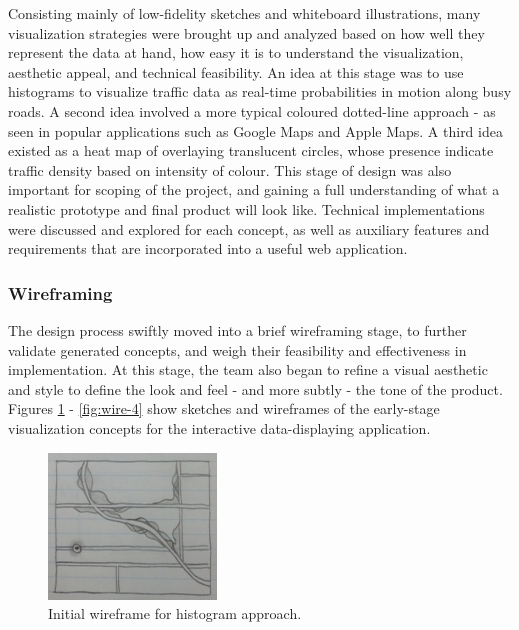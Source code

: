 \documentclass{article}
\begin{document}
Consisting mainly of low-fidelity sketches and whiteboard illustrations, many visualization strategies were brought up and analyzed based on how well they represent the data at hand, how easy it is to understand the visualization, aesthetic appeal, and technical feasibility.
An idea at this stage was to use histograms to visualize traffic data as real-time probabilities in motion along busy roads.
A second idea involved a more typical coloured dotted-line approach - as seen in popular applications such as Google Maps and Apple Maps.
A third idea existed as a heat map of overlaying translucent circles, whose presence indicate traffic density based on intensity of colour.
This stage of design was also important for scoping of the project, and gaining a full understanding of what a realistic prototype and final product will look like.
Technical implementations were discussed and explored for each concept, as well as auxiliary features and requirements that are incorporated into a useful web application.\\

\subsubsection{Wireframing}

The design process swiftly moved into a brief wireframing stage, to further validate generated concepts, and weigh their feasibility and effectiveness in implementation.
At this stage, the team also began to refine a visual aesthetic and style to define the look and feel - and more subtly - the tone of the product.
Figures \ref{fig:wire-1} - \ref{fig:wire-4} show sketches and wireframes of the early-stage visualization concepts for the interactive data-displaying application.\\

\begin{figure}[htbp!]
  \begin{centering}
    \includegraphics[scale=1]{figures/wire-1.png}
    \caption{Initial wireframe for histogram approach.}
    \label{fig:wire-1}
  \end{centering}
\end{figure}
\end{document}
